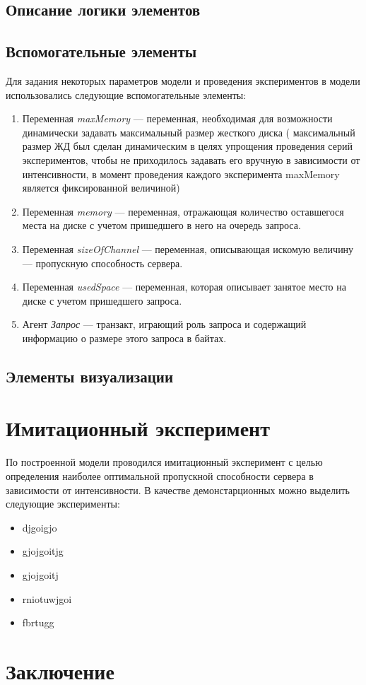\subsection{Описание логики элементов}

\subsection{Вспомогательные элементы}
Для задания некоторых параметров модели и проведения экспериментов в модели использовались следующие вспомогательные элементы:
\begin{enumerate}
    \item Переменная \textit{maxMemory} --- переменная, необходимая для возможности динамически задавать максимальный размер жесткого диска (
    максимальный размер ЖД был сделан динамическим в целях упрощения проведения серий экспериментов, чтобы не приходилось задавать его вручную
    в зависимости от интенсивности, в момент проведения каждого эксперимента maxMemory является фиксированной величиной)
    \item Переменная \textit{memory} --- переменная, отражающая количество оставшегося места на диске с учетом пришедшего в него на очередь запроса.
    \item Переменная \textit{sizeOfChannel} --- переменная, описывающая искомую величину --- пропускную способность сервера.
    \item Переменная \textit{usedSpace} --- переменная, которая описывает занятое место на диске с учетом пришедшего запроса.
    \item Агент \textit{Запрос} --- транзакт, играющий роль запроса и содержащий информацию о размере этого запроса в байтах.
\end{enumerate}

\subsection{Элементы визуализации}

\newpage
\section{Имитационный эксперимент}
По построенной модели проводился имитационный эксперимент с целью определения наиболее
оптимальной пропускной способности сервера в зависимости от интенсивности.
В качестве демонстарционных можно выделить следующие эксперименты:
\begin{itemize}
    \item djgoigjo
    \item gjojgoitjg
    \item gjojgoitj
    \item rniotuwjgoi
    \item fbrtugg
\end{itemize}



\newpage
\section{Заключение}



